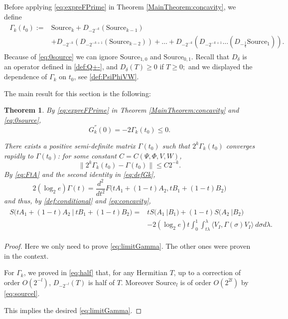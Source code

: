 \documentclass{article}
\numberwithin{equation}{section}
\newtheorem{theorem}{Theorem}[section]
\begin{document}
Before applying \eqref{eq:expreFPrime} in Theorem \ref{MainTheorem:concavity}, we define 
\begin{align}\label{def:Gammak}
\begin{split}
\Gamma_k(t_0) :=& \text{Source}_k + D_{-2^{-k}}(\text{Source}_{k-1})\\
& + D_{-2^{-k}}(D_{-2^{-k+1}}(\text{Source}_{k-2})) + \dots + D_{-2^{-k}}(D_{-2^{-k+1}} \dots (D_{-\frac{1}{4}} \text{Source}_1)).
\end{split}
\end{align} Because of \eqref{eq:0source} we can ignore $\text{Source}_{1,0}$ and $\text{Source}_{0,1}$.
Recall that $D_{\delta}$ is an operator defined in \eqref{def:Q+-}, and $D_{\delta}(T)\geq 0$ if $T\geq 0;$ and we displayed the dependence of $\Gamma_k$ on $t_0$, see \eqref{def:PsiPhiVW}.

The main result for this section is the following: 
\begin{theorem}\label{MainTHM:convex}
By \eqref{eq:expreFPrime} in Theorem \ref{MainTheorem:concavity} and \eqref{eq:0source},
\begin{equation}
  G_{k}^{''}(0)=-2\Gamma_{k}(t_0)\leq 0.
\end{equation}  

There exists a positive semi-definite matrix $\Gamma(t_0)$ such that $2^{k} \Gamma_k(t_0)$ converges rapidly to $\Gamma(t_0)$: for some constant $C=C(\Psi,\Phi, V, W)$,
\begin{equation}\label{eq:limitGamma}
\|2^k \Gamma_k(t_0) - \Gamma(t_0)\|\leq C 2^{-k}.
\end{equation}
By \eqref{eq:FtA} and the second identity in \eqref{eq:defGk},
\begin{equation}\label{eq:GammaT}
2 (\log_2 e)\Gamma(t)  = \frac{d^2}{dt^2} F\big(tA_1+(1-t)A_2, tB_1+(1-t)B_2\big) 
\end{equation} and thus, by \eqref{def:conditional} and \eqref{eq:concavity},
\begin{align}
\begin{split}
  S\big(tA_1+(1-t)A_2\ \big|\ tB_1+(1-t)B_2\big)=&tS\big(A_1\ \big| B_1\big)+(1-t)S\big(A_2\ \big| B_2\big)\\
  &-2(\log_2 e) t\int_{0}^{1} \int^{\lambda}_{t\lambda} \langle V_{I}, \Gamma(\sigma) V_{I}\rangle \ d\sigma d\lambda.
\end{split}
\end{align}

\end{theorem}
\begin{proof}
Here we only need to prove \eqref{eq:limitGamma}. The other ones were proven in the context.

For $\Gamma_{k}$, we proved in \eqref{eq:half} that, for any Hermitian $T$, up to a correction of order $O(2^{-l})$, $D_{-2^{-l}}(T)$ is half of $T.$ Moreover $\text{Source}_{l}$ is of order $O(2^{2l})$ by \eqref{eq:sourcel}.

This implies the desired \eqref{eq:limitGamma}.

\end{proof}
\end{document}

